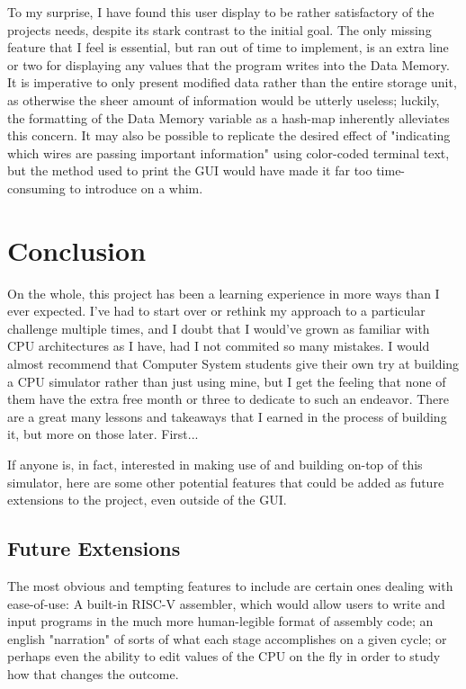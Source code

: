 \documentclass[12pt,twoside]{reedthesis}
\begin{document}
To my surprise, I have found this user display to be rather satisfactory of the projects needs, despite its stark contrast to the initial goal. The only missing feature that I feel is essential, but ran out of time to implement, is an extra line or two for displaying any values that the program writes into the Data Memory. It is imperative to only present modified data rather than the entire storage unit, as otherwise the sheer amount of information would be utterly useless; luckily, the formatting of the Data Memory variable as a hash-map inherently alleviates this concern. It may also be possible to replicate the desired effect of "indicating which wires are passing important information" using color-coded terminal text, but the method used to print the GUI would have made it far too time-consuming to introduce on a whim.


\chapter*{Conclusion}
\setcounter{chapter}{4}
\setcounter{section}{0}

On the whole, this project has been a learning experience in more ways than I ever expected. I've had to start over or rethink my approach to a particular challenge multiple times, and I doubt that I would've grown as familiar with CPU architectures as I have, had I not commited so many mistakes. I would almost recommend that Computer System students give their own try at building a CPU simulator rather than just using mine, but I get the feeling that none of them have the extra free month or three to dedicate to such an endeavor.
There are a great many lessons and takeaways that I earned in the process of building it, but more on those later. First...

If anyone is, in fact, interested in making use of and building on-top of this simulator, here are some other potential features that could be added as future extensions to the project, even outside of the GUI.

\section{Future Extensions}

The most obvious and tempting features to include are certain ones dealing with ease-of-use: A built-in RISC-V assembler, which would allow users to write and input programs in the much more human-legible format of assembly code; an english "narration" of sorts of what each stage accomplishes on a given cycle; or perhaps even the ability to edit values of the CPU on the fly in order to study how that changes the outcome.
\end{document}
